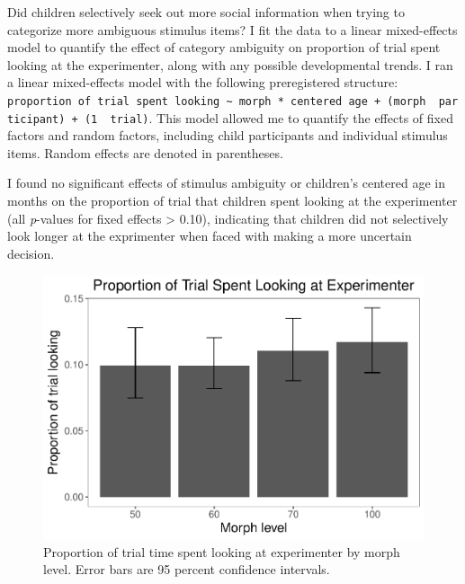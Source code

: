 \documentclass[floatsintext,man]{apa6}
\theoremstyle{definition}
\theoremstyle{definition}
\theoremstyle{definition}
\theoremstyle{remark}
\begin{document}
Did children selectively seek out more social information when trying to
categorize more ambiguous stimulus items? I fit the data to a linear
mixed-effects model to quantify the effect of category ambiguity on
proportion of trial spent looking at the experimenter, along with any
possible developmental trends. I ran a linear mixed-effects model with
the following preregistered structure:
\texttt{proportion\ of\ trial\ spent\ looking\ \textasciitilde{}\ morph\ *\ centered\ age\ +\ (morph\ \textbar{}\ participant)\ +\ (1\ \textbar{}\ trial)}.
This model allowed me to quantify the effects of fixed factors and
random factors, including child participants and individual stimulus
items. Random effects are denoted in parentheses.

I found no significant effects of stimulus ambiguity or children's
centered age in months on the proportion of trial that children spent
looking at the experimenter (all \emph{p}-values for fixed effects
\textgreater{} 0.10), indicating that children did not selectively look
longer at the exprimenter when faced with making a more uncertain
decision.

\begin{figure}
\centering
\includegraphics{soc_ref_category_paper_files/figure-latex/morphlooking-1.pdf}
\caption{\label{fig:morphlooking}Proportion of trial time spent looking at
experimenter by morph level. Error bars are 95 percent confidence
intervals.}
\end{figure}
\end{document}
